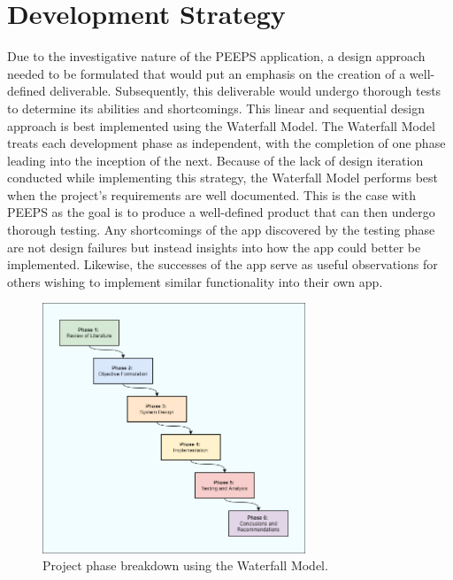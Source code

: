 \section{Development Strategy}
Due to the investigative nature of the PEEPS application, a design approach needed to be formulated that would put an emphasis on the creation of a well-defined deliverable. Subsequently, this deliverable would undergo thorough tests to determine its abilities and shortcomings. This linear and sequential design approach is best implemented using the Waterfall Model. The Waterfall Model treats each development phase as independent, with the completion of one phase leading into the inception of the next. Because of the lack of design iteration conducted while implementing this strategy, the Waterfall Model performs best when the project's requirements are well documented. This is the case with PEEPS as the goal is to produce a well-defined product that can then undergo thorough testing. Any shortcomings of the app discovered by the testing phase are not design failures but instead insights into how the app could better be implemented. Likewise, the successes of the app serve as useful observations for others wishing to implement similar functionality into their own app.

\begin{figure}[ht]
\centering
\includegraphics[width=0.7\textwidth]{figures/waterfall.png}
\caption{Project phase breakdown using the Waterfall Model.}
\label{fig:phase_breakdown}
\end{figure}


